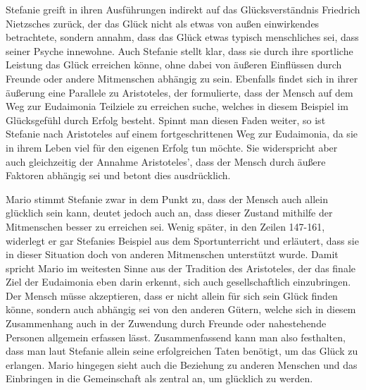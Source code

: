 Stefanie greift in ihren Ausführungen indirekt auf das Glücksverständnis Friedrich Nietzsches zurück, der das Glück nicht als etwas von außen einwirkendes betrachtete, sondern annahm, dass das Glück etwas typisch menschliches sei, dass seiner Psyche innewohne. 
Auch Stefanie stellt klar, dass sie durch ihre sportliche Leistung das Glück erreichen könne, ohne dabei von äußeren Einflüssen durch Freunde oder andere Mitmenschen abhängig zu sein. 
Ebenfalls findet sich in ihrer äußerung eine Parallele zu Aristoteles, der formulierte, dass der Mensch auf dem Weg zur Eudaimonia Teilziele zu erreichen suche, welches in diesem Beispiel im Glücksgefühl durch Erfolg besteht. 
Spinnt man diesen Faden weiter, so ist Stefanie nach Aristoteles auf einem fortgeschrittenen Weg zur Eudaimonia, da sie in ihrem Leben viel für den eigenen Erfolg tun möchte. 
Sie widerspricht aber auch gleichzeitig der Annahme Aristoteles', dass der Mensch durch äußere Faktoren abhängig sei und betont dies ausdrücklich.

Mario stimmt Stefanie zwar in dem Punkt zu, dass der Mensch auch allein glücklich sein kann, deutet jedoch auch an, dass dieser Zustand mithilfe der Mitmenschen besser zu erreichen sei. 
Wenig später, in den Zeilen 147-161, widerlegt er gar Stefanies Beispiel aus dem Sportunterricht und erläutert, dass sie in dieser Situation doch von anderen Mitmenschen unterstützt wurde. 
Damit spricht Mario im weitesten Sinne aus der Tradition des Aristoteles, der das finale Ziel der Eudaimonia eben darin erkennt, sich auch gesellschaftlich einzubringen. 
Der Mensch müsse akzeptieren, dass er nicht allein für sich sein Glück finden könne, sondern auch abhängig sei von den anderen Gütern, welche sich in diesem Zusammenhang auch in der Zuwendung durch Freunde oder nahestehende Personen allgemein erfassen lässt. 
Zusammenfassend kann man also festhalten, dass man laut Stefanie allein seine erfolgreichen Taten benötigt, um das Glück zu erlangen. 
Mario hingegen sieht auch die Beziehung zu anderen Menschen und das Einbringen in die Gemeinschaft als zentral an, um glücklich zu werden.

